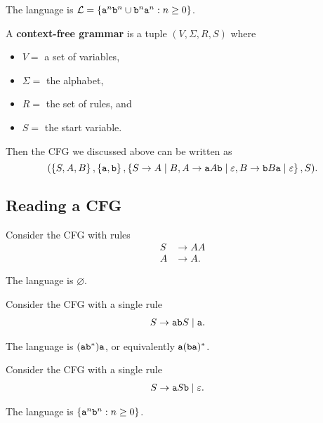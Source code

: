 \documentclass{notes}
\begin{document}
The language is $\mathcal L = \left \{ \verb~a~^n \verb~b~^n \cup \verb~b~^n \verb~a~^n : n \geq 0 \right \}$.

\newpage

\begin{defn}
  A {\boldmath \bfseries context-free grammar} is a tuple $(V, \Sigma, R, S)$ where
  \begin{itemize}
    \item $V = $ a set of variables,  

    \item $\Sigma = $ the alphabet,  

    \item $R = $ the set of rules, and  

    \item $S = $ the start variable.
  \end{itemize}
\end{defn}

Then the CFG we discussed above can be written as 
\[
  (\left \{ S, A, B \right \}, \left \{ \verb~a~, \verb~b~ \right \}, \left \{ S \to A \; | \; B, A \to \verb~a~ A \verb~b~ \; | \; \varepsilon, B \to \verb~b~ B \verb~a~ \; | \; \varepsilon \right \}, S).
\]

\newpage

\subsection{Reading a CFG}

\begin{eg}
  Consider the CFG with rules
  \begin{align*}
    S &\to A A \\ 
    A &\to A.
  \end{align*}
  
  The language is $\varnothing$.
\end{eg}

\begin{eg}
  Consider the CFG with a single rule 
  \begin{align*}
    S &\to \verb~ab~ S \; | \; \verb~a~.
  \end{align*}
  
  The language is $(\verb~ab~^*) \verb~a~$, or equivalently $\verb~a~ (\verb~ba~)^*$.
\end{eg}

\begin{eg}
  Consider the CFG with a single rule 
  \begin{align*}
    S &\to \verb~a~ S \verb~b~ \; | \; \varepsilon.
  \end{align*}
  
  The language is $\left \{ \verb~a~^n \verb~b~^n : n \geq 0 \right \}$.
\end{eg}
\end{document}
